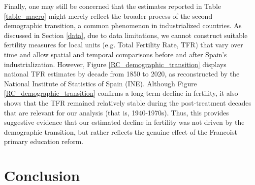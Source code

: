 \documentclass[a4paper,oneside,final,onecolumn,12pt,english]{article}
\begin{document}
Finally, one may still be concerned that the estimates reported in Table \ref{table_macro} might merely reflect the broader process of the second demographic transition, a common phenomenon in industrialized countries. As discussed in Section \ref{data}, due to data limitations, we cannot construct suitable fertility measures for local units (e.g. Total Fertility Rate, TFR) that vary over time and allow spatial and temporal comparisons before and after Spain’s industrialization. However, Figure \ref{RC_demographic_transition} displays national TFR estimates by decade from 1850 to 2020, as reconstructed by the National Institute of Statistics of Spain (INE). Although Figure \ref{RC_demographic_transition} confirms a long-term decline in fertility, it also shows that the TFR remained relatively stable during the post-treatment decades that are relevant for our analysis (that is, 1940-1970s). Thus, this provides suggestive evidence that our estimated decline in fertility was not driven by the demographic transition, but rather reflects the genuine effect of the Francoist primary education reform.




\section{Conclusion} \label{conclusion}

\end{document}
